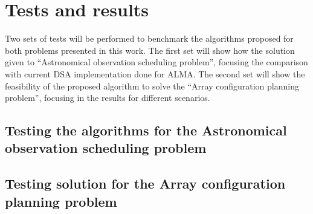 \chapter{Tests and results}

Two sets of tests will be performed to benchmark the algorithms proposed for both problems presented in this work.
The first set will show how the solution given to ``Astronomical observation scheduling problem'', focusing the comparison with current DSA implementation done for ALMA.
The second set will show the feasibility of the proposed algorithm to solve the ``Array configuration planning problem'', focusing in the results for different scenarios.

\section{Testing the algorithms for the Astronomical observation scheduling problem}

\section{Testing solution for the Array configuration planning problem} 

